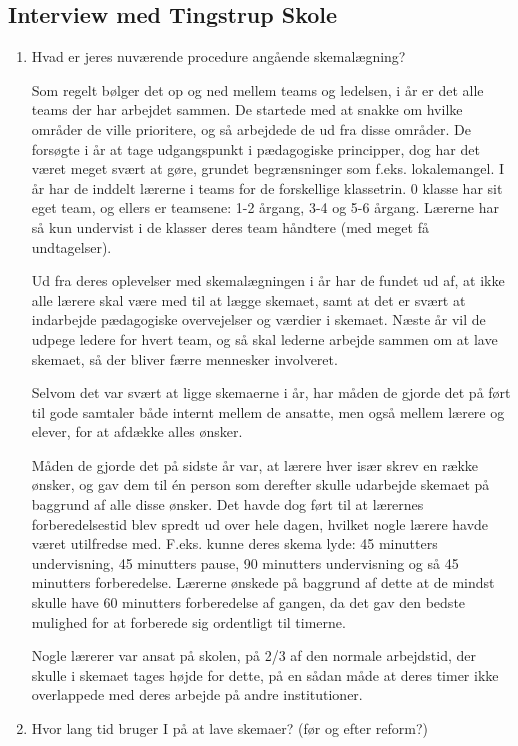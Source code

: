 \subsection{Interview med Tingstrup Skole}
\begin{enumerate}
	\item Hvad er jeres nuværende procedure angående skemalægning?

	Som regelt bølger det op og ned mellem teams og ledelsen, i år er det alle teams der har arbejdet sammen. De startede med at snakke om hvilke områder de ville prioritere, og så arbejdede de ud fra disse områder. De forsøgte i år at tage udgangspunkt i pædagogiske principper, dog har det været meget svært at gøre, grundet begrænsninger som f.eks. lokalemangel. I år har de inddelt lærerne i teams for de forskellige klassetrin. 0 klasse har sit eget team, og ellers er teamsene: 1-2 årgang, 3-4 og 5-6 årgang. Lærerne har så kun undervist i de klasser deres team håndtere (med meget få undtagelser).

	Ud fra deres oplevelser med skemalægningen i år har de fundet ud af, at ikke alle lærere skal være med til at lægge skemaet, samt at det er svært at indarbejde pædagogiske overvejelser og værdier i skemaet. Næste år vil de udpege ledere for hvert team, og så skal lederne arbejde sammen om at lave skemaet, så der bliver færre mennesker involveret.

	Selvom det var svært at ligge skemaerne i år, har måden de gjorde det på ført til gode samtaler både internt mellem de ansatte, men også mellem lærere og elever, for at afdække alles ønsker.

	Måden de gjorde det på sidste år var, at lærere hver især skrev en række ønsker, og gav dem til \'en person som derefter skulle udarbejde skemaet på baggrund af alle disse ønsker. Det havde dog ført til at lærernes forberedelsestid blev spredt ud over hele dagen, hvilket nogle lærere havde været utilfredse med. F.eks. kunne deres skema lyde: 45 minutters undervisning, 45 minutters pause, 90 minutters undervisning og så 45 minutters forberedelse. Lærerne ønskede på baggrund af dette at de mindst skulle have 60 minutters forberedelse af gangen, da det gav den bedste mulighed for at forberede sig ordentligt til timerne.

	Nogle lærerer var ansat på skolen, på 2/3 af den normale arbejdstid, der skulle i skemaet tages højde for dette, på en sådan måde at deres timer ikke overlappede med deres arbejde på andre institutioner.

	
	\item Hvor lang tid bruger I på at lave skemaer? (før og efter reform?)


\end{enumerate}
